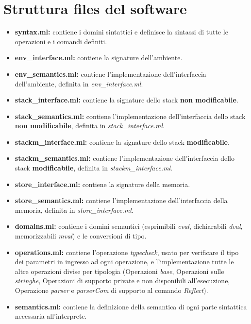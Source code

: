 \documentclass[a4paper,titlepage]{book}
\begin{document}
\section{Struttura files del software}
\begin{itemize}
\item \textbf{syntax.ml:} contiene i domini sintattici e definisce la sintassi di tutte le operazioni e i comandi definiti.
\item \textbf{env\_interface.ml:} contiene la signature dell'ambiente.
\item \textbf{env\_semantics.ml:} contiene l'implementazione dell'interfaccia dell'ambiente, definita in \textit{env\_interface.ml}.
\item \textbf{stack\_interface.ml:} contiene la signature dello stack \textbf{non modificabile}.
\item \textbf{stack\_semantics.ml:} contiene l'implementazione dell'interfaccia dello stack \textbf{non modificabile}, definita in \textit{stack\_interface.ml}.
\item \textbf{stackm\_interface.ml:} contiene la signature dello stack \textbf{modificabile}.
\item \textbf{stackm\_semantics.ml:} contiene l'implementazione dell'interfaccia dello stack \textbf{modificabile}, definita in \textit{stackm\_interface.ml}.
\item \textbf{store\_interface.ml:} contiene la signature della memoria.
\item \textbf{store\_semantics.ml:} contiene l'implementazione dell'interfaccia della memoria, definita in \textit{store\_interface.ml}.
\item \textbf{domains.ml:} contiene i domini semantici (esprimibili \textit{eval}, dichiarabili \textit{dval}, memorizzabili \textit{mval}) e le conversioni di tipo.
\item \textbf{operations.ml:} contiene l'operazione \textit{typecheck}, usato per verificare il tipo dei parametri in ingresso ad ogni operazione, e l'implementazione tutte le altre operazioni divise per tipologia (Operazioni \textit{base}, Operazioni sulle \textit{stringhe}, Operazioni di supporto private e non disponibili all'esecuzione, Operazione \textit{parser} e \textit{parserCom} di supporto al comando \textit{Reflect}).
\item \textbf{semantics.ml:} contiene la definizione della semantica di ogni parte sintattica necessaria all'interprete.
\end{itemize}

\clearpage
\thispagestyle{empty}
\end{document}
